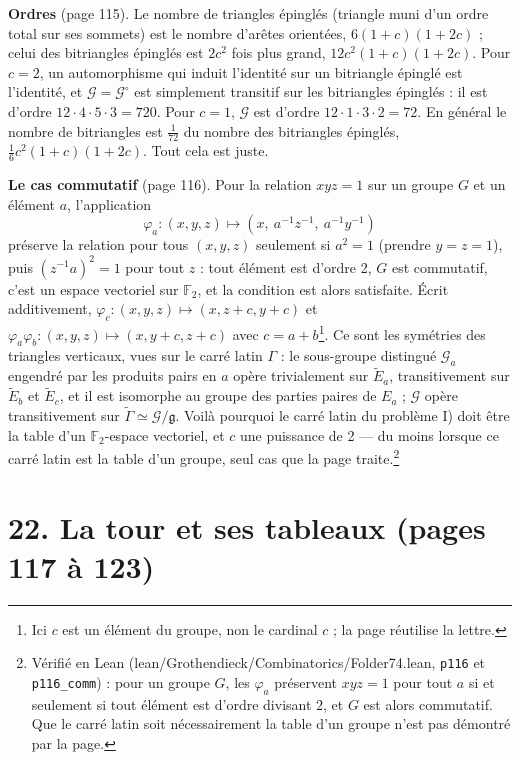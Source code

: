 \documentclass[11pt,a4paper]{article}
\begin{document}
\textbf{Ordres} (page 115). Le nombre de triangles épinglés (triangle muni d'un
ordre total sur ses sommets) est le nombre d'arêtes orientées, $6(1+c)(1+2c)$ ;
celui des bitriangles épinglés est $2c^2$ fois plus grand, $12c^2(1+c)(1+2c)$.
Pour $c = 2$, un automorphisme qui induit l'identité sur un bitriangle épinglé
est l'identité, et $\mathcal{G} = \mathcal{G}^\circ$ est simplement transitif sur
les bitriangles épinglés : il est d'ordre $12 \cdot 4 \cdot 5 \cdot 3 = 720$. Pour
$c = 1$, $\mathcal{G}$ est d'ordre $12 \cdot 1 \cdot 3 \cdot 2 = 72$. En
général le nombre de bitriangles est $\frac{1}{72}$ du nombre des bitriangles
épinglés, $\frac16 c^2(1+c)(1+2c)$. Tout cela est juste.

\textbf{Le cas commutatif} (page 116). Pour la relation $xyz = 1$ sur un groupe
$G$ et un élément $a$, l'application
\[
\varphi_a : (x, y, z) \longmapsto (x,\ a^{-1}z^{-1},\ a^{-1}y^{-1})
\]
préserve la relation pour tous $(x, y, z)$ seulement si $a^2 = 1$ (prendre $y = z
= 1$), puis $(z^{-1}a)^2 = 1$ pour tout $z$ : tout élément est d'ordre 2, $G$ est
commutatif, c'est un espace vectoriel sur $\mathbb{F}_2$, et la condition est
alors satisfaite. Écrit additivement, $\varphi_c : (x, y, z) \mapsto (x, z + c, y +
c)$ et $\varphi_a \varphi_b : (x, y, z) \mapsto (x, y + c, z + c)$ avec $c = a +
b$\footnote{Ici $c$ est un élément du groupe, non le cardinal $c$ ; la page
réutilise la lettre.}. Ce sont les symétries des triangles verticaux, vues sur le
carré latin $\Gamma$ : le sous-groupe distingué $\mathcal{G}_a$ engendré par les
produits pairs en $a$ opère trivialement sur $\widetilde E_a$, transitivement sur
$\widetilde E_b$ et $\widetilde E_c$, et il est isomorphe au groupe des parties
paires de $E_a$ ; $\mathcal{G}$ opère transitivement sur $\widetilde\Gamma \simeq
\mathcal{G}/\mathfrak{g}$. Voilà pourquoi le carré latin du problème I) doit être la
table d'un $\mathbb{F}_2$-espace vectoriel, et $c$ une puissance de 2 --- du
moins lorsque ce carré latin est la table d'un groupe, seul cas que la page
traite.\footnote{Vérifié en Lean (lean/Grothendieck/Combinatorics/Folder74.lean,
\texttt{p116} et \texttt{p116\_comm}) : pour un groupe $G$, les $\varphi_a$
préservent $xyz = 1$ pour tout $a$ si et seulement si tout élément est d'ordre
divisant $2$, et $G$ est alors commutatif. Que le carré latin soit
nécessairement la table d'un groupe n'est pas démontré par la page.}

\section*{22. La tour et ses tableaux (pages 117 à 123)}
\end{document}
